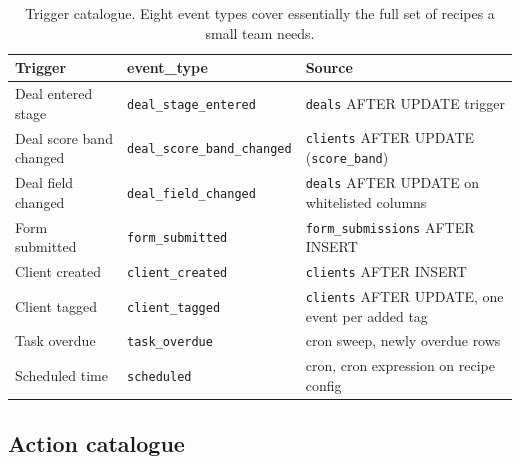 \documentclass[11pt,a4paper,oneside]{article}
\newcommand{\code}[1]{\texttt{\small #1}}
\begin{document}
\begin{table}[H]
\centering
\small
\begin{tabularx}{\textwidth}{@{}llX@{}}
\toprule
\textbf{Trigger}            & \textbf{event\_type}              & \textbf{Source} \\
\midrule
Deal entered stage          & \code{deal\_stage\_entered}       & \code{deals} AFTER UPDATE trigger \\
Deal score band changed     & \code{deal\_score\_band\_changed} & \code{clients} AFTER UPDATE (\code{score\_band}) \\
Deal field changed          & \code{deal\_field\_changed}       & \code{deals} AFTER UPDATE on whitelisted columns \\
Form submitted              & \code{form\_submitted}            & \code{form\_submissions} AFTER INSERT \\
Client created              & \code{client\_created}            & \code{clients} AFTER INSERT \\
Client tagged               & \code{client\_tagged}             & \code{clients} AFTER UPDATE, one event per added tag \\
Task overdue                & \code{task\_overdue}              & cron sweep, newly overdue rows \\
Scheduled time              & \code{scheduled}                  & cron, cron expression on recipe config \\
\bottomrule
\end{tabularx}
\caption{Trigger catalogue. Eight event types cover essentially the
full set of recipes a small team needs.}
\label{tab:triggers}
\end{table}

\subsection{Action catalogue}
\end{document}
